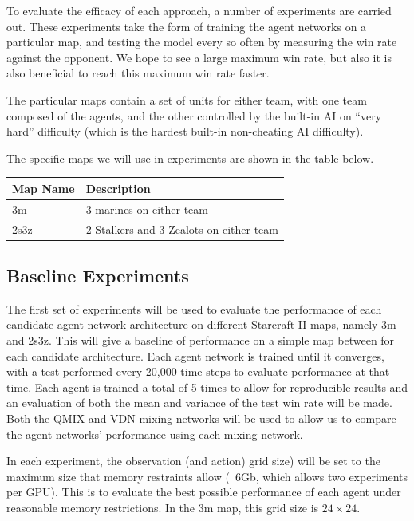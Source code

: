 To evaluate the efficacy of each approach, a number of experiments are carried out. These experiments take the form of training the agent networks on a particular map, and testing the model every so often by measuring the win rate against the opponent. We hope to see a large maximum win rate, but also it is also beneficial to reach this maximum win rate faster. 

The particular maps contain a set of units for either team, with one team composed of the agents, and the other controlled by the built-in AI on ``very hard'' difficulty (which is the hardest built-in non-cheating AI difficulty).

The specific maps we will use in experiments are shown in the table below.

\vspace{3mm}
\begin{tabular}{ |p{2.5cm}||p{6.6cm}|  }
 \hline
 Map Name& Description\\
 \hline
 3m   & 3 marines on either team\\
 \hline
 2s3z   & 2 Stalkers and 3 Zealots on either team\\
 \hline
\end{tabular}

\subsection{Baseline Experiments}

The first set of experiments will be used to evaluate the performance of each candidate agent network architecture on different Starcraft II maps, namely 3m and 2s3z. This will give a baseline of performance on a simple map between for each candidate architecture. Each agent network is trained until it converges, with a test performed every 20,000 time steps to evaluate performance at that time. Each agent is trained a total of 5 times to allow for reproducible results and an evaluation of both the mean and variance of the test win rate will be made. Both the QMIX and VDN mixing networks will be used to allow us to compare the agent networks' performance using each mixing network.

In each experiment, the observation (and action) grid size) will be set to the maximum size that memory restraints allow (~6Gb, which allows two experiments per GPU). This is to evaluate the best possible performance of each agent under reasonable memory restrictions. In the 3m map, this grid size is $24 \times 24$.


